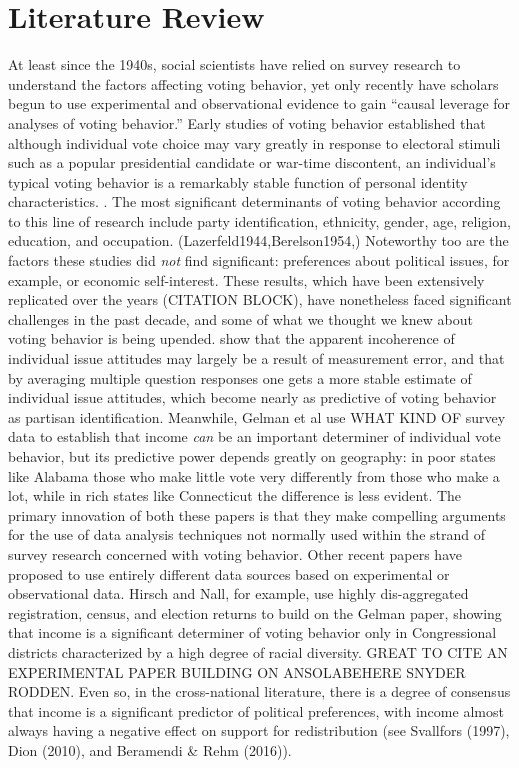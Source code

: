 \section{Literature Review}
At least since the 1940s, social scientists have relied on survey research to understand the factors affecting voting behavior, yet only recently have scholars begun to use experimental and observational evidence to gain ``causal leverage for analyses of voting behavior.''\cite{bartels_larry_m._study_2010} Early studies of voting behavior established that although individual vote choice may vary greatly in response to electoral stimuli such as a popular presidential candidate or war-time discontent, an individual's typical voting behavior is a remarkably stable function of personal identity characteristics. \cite{ConverseNormalVote}. The most significant determinants of voting behavior according to this line of research include party identification, ethnicity, gender, age, religion, education, and occupation. (Lazerfeld1944,Berelson1954,) Noteworthy too are the factors these studies did \textit{not} find significant: preferences about political issues, for example, or economic self-interest. These results, which have been extensively replicated over the years (CITATION BLOCK), have nonetheless faced significant challenges in the past decade, and some of what we thought we knew about voting behavior is being upended. \cite{Ansolabehere_Snyder_Rodden} show that the apparent incoherence of individual issue attitudes may largely be a result of measurement error, and that by averaging multiple question responses one gets a more stable estimate of individual issue attitudes, which become nearly as predictive of voting behavior as partisan identification. Meanwhile, Gelman et al use WHAT KIND OF survey data to establish that income \textit{can} be an important determiner of individual vote behavior, but its predictive power depends greatly on geography: in poor states like Alabama those who make little vote very differently from those who make a lot, while in rich states like Connecticut the difference is less evident. The primary innovation of both these papers is that they make compelling arguments for the use of data analysis techniques not normally used within the strand of survey research concerned with voting behavior. Other recent papers have proposed to use entirely different data sources based on experimental or observational data. Hirsch and Nall, for example, use highly dis-aggregated registration, census, and election returns to build on the Gelman paper, showing that income is a significant determiner of voting behavior only in Congressional districts characterized by a high degree of racial diversity. GREAT TO CITE AN EXPERIMENTAL PAPER BUILDING ON ANSOLABEHERE SNYDER RODDEN. Even so, in the cross-national literature, there is a degree of consensus that income is a significant predictor of political preferences, with income almost always having a negative effect on support for redistribution (see Svallfors (1997), Dion (2010), and Beramendi \& Rehm (2016)). 


